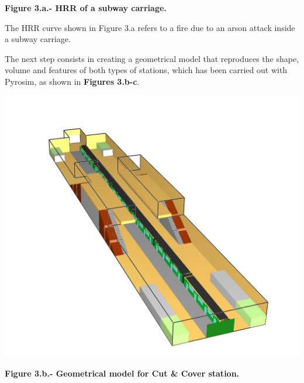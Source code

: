 \documentclass{article}
\begin{document}
\begin{mdcenter}%

\noindent{}\textbf{Figure 3.a.- HRR of a subway carriage.}%
\end{mdcenter}%

\noindent{}The HRR curve shown in Figure 3.a refers to a fire due to an arson attack 
inside a subway carriage.%

The next step consists in creating a geometrical model that reproduces 
the shape, volume and features of both types of stations, which has been 
carried out with Pyrosim, as shown in \textbf{Figures 3.b-c}.%

\begin{mdcenter}%

\noindent{}\includegraphics[keepaspectratio=true,width=\dimmin{}{\dimwidth{0.45}}]{images/Fig-3.b}{}%
\end{mdcenter}%

\begin{mdcenter}%

\noindent{}\textbf{Figure 3.b.- Geometrical model for Cut \& Cover station.}%
\end{mdcenter}%
\end{document}
